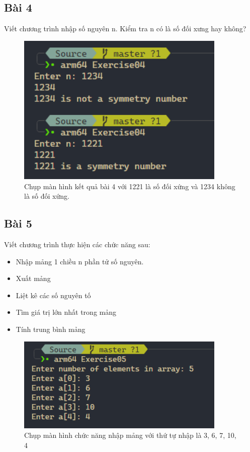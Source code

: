 \subsection{Bài 4}

Viết chương trình nhập số nguyên n. Kiểm tra n có là số đối xưng hay không?

\begin{figure}[H]
	\centering
	\includegraphics[width=10cm]{images/img4.PNG}
	\caption{Chụp màn hình kết quả bài 4 với 1221 là số đối xứng và 1234 không là số đối xứng.}
\end{figure}

\subsection{Bài 5}

Viết chương trình thực hiện các chức năng sau:
\begin{itemize}
	\item Nhập mảng 1 chiều n phần tử số nguyên.
	\item Xuất mảng
	\item Liệt kê các số nguyên tố
	\item Tìm giá trị lớn nhất trong mảng
	\item Tính trung bình mảng
\end{itemize}

\begin{figure}[H]
	\centering
	\includegraphics[width=10cm]{images/img5_0.PNG}
	\caption{Chụp màn hình chức năng nhập mảng với thứ tự nhập là 3, 6, 7, 10, 4}
\end{figure}

